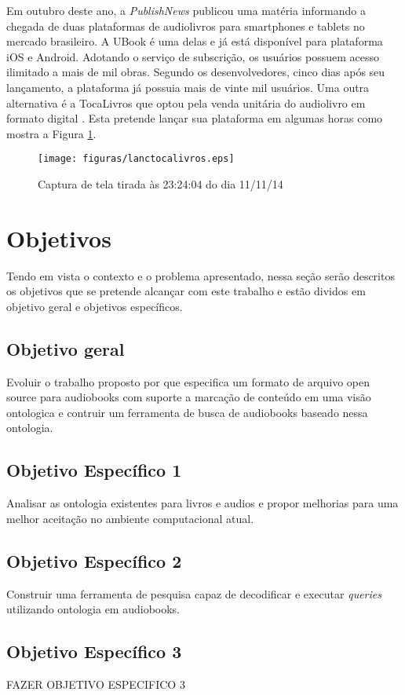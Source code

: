 Em outubro deste ano, a \textit{PublishNews} publicou uma matéria informando a chegada de duas plataformas de audiolivros para smartphones e tablets no mercado brasileiro. A UBook é uma delas e já está disponível para plataforma iOS e Android. Adotando o serviço de subscrição, os usuários possuem acesso ilimitado a mais de mil obras. Segundo os desenvolvedores, cinco dias após seu lançamento, a plataforma já possuia mais de vinte mil usuários. Uma outra alternativa é a TocaLivros que optou pela venda unitária do audiolivro em formato digital \cite{publishnews}. Esta pretende lançar sua plataforma em algumas horas como mostra a Figura \ref{lanctocalivros}.

 \begin{figure}[ht]
	\centering
		\texttt{[image: figuras/lanctocalivros.eps]}
	\caption{Captura de tela tirada às 23:24:04 do dia 11/11/14 \cite{tocalivros}}
	\label{lanctocalivros}
\end{figure}

\section{Objetivos}
Tendo em vista o contexto e o problema apresentado, nessa seção serão descritos os objetivos que se pretende alcançar com este trabalho e estão dividos em objetivo geral e objetivos específicos.
\subsection{Objetivo geral}
Evoluir o trabalho proposto por \cite{herbert} que especifica um formato de arquivo open source para audiobooks com suporte a marcação de conteúdo em uma visão ontologica e contruir um ferramenta de busca de audiobooks baseado nessa ontologia.
\subsection{Objetivo Específico 1}
Analisar as ontologia existentes para livros e audios e propor melhorias para uma melhor aceitação no ambiente computacional atual.
\subsection{Objetivo Específico 2}
Construir uma ferramenta de pesquisa capaz de decodificar e executar \textit{queries} utilizando ontologia em audiobooks.
\subsection{Objetivo Específico 3}
FAZER OBJETIVO ESPECIFICO 3


